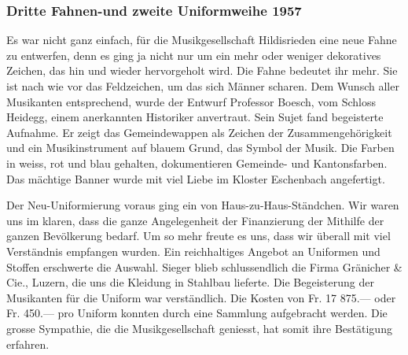 \begin{history}
    \subsubsection*{Dritte Fahnen-und zweite Uniformweihe 1957}

    Es war nicht ganz einfach, für die Musikgesellschaft Hildisrieden eine neue
    Fahne zu entwerfen, denn es ging ja nicht nur um ein mehr oder weniger
    dekoratives Zeichen, das hin und wieder hervorgeholt wird. Die Fahne
    bedeutet ihr mehr. Sie ist nach wie vor das Feldzeichen, um das sich Männer
    scharen. Dem Wunsch aller Musikanten entsprechend, wurde der Entwurf
    Professor Boesch, vom Schloss Heidegg, einem anerkannten Historiker
    anvertraut. Sein Sujet fand begeisterte Aufnahme. Er zeigt das
    Gemeindewappen als Zeichen der Zusammengehörigkeit und ein Musikinstrument
    auf blauem Grund, das Symbol der Musik. Die Farben in weiss, rot und blau
    gehalten, dokumentieren Gemeinde- und Kantonsfarben. Das mächtige Banner wurde
    mit viel Liebe im Kloster Eschenbach angefertigt.

    Der Neu-Uniformierung voraus ging ein von Haus-zu-Haus-Ständchen. Wir waren
    uns im klaren, dass die ganze Angelegenheit der Finanzierung der Mithilfe
    der ganzen Bevölkerung bedarf. Um so mehr freute es uns, dass wir überall
    mit viel Verständnis empfangen wurden. Ein reichhaltiges Angebot an
    Uniformen und Stoffen erschwerte die Auswahl. Sieger blieb schlussendlich
    die Firma Gränicher \& Cie., Luzern, die uns die Kleidung in Stahlbau
    lieferte. Die Begeisterung der Musikanten für die Uniform war verständlich.
    Die Kosten von Fr. 17 875.— oder Fr. 450.— pro Uniform konnten durch eine
    Sammlung aufgebracht werden. Die grosse Sympathie, die die Musikgesellschaft
    geniesst, hat somit ihre Bestätigung erfahren.

\end{history}

